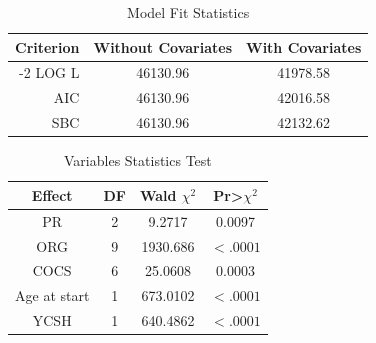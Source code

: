 \begin{table}[htbp]
	\small
	\centering
	\caption{Model Fit Statistics}
	\begin{tabular}{rrr}
		\hline
		\multicolumn{1}{c}{Criterion} & \multicolumn{1}{c}{Without Covariates} & \multicolumn{1}{c}{With Covariates} \\
		\hline
		-2 LOG L & \multicolumn{1}{c}{46130.96} & \multicolumn{1}{c}{41978.58} \\
		AIC   & \multicolumn{1}{c}{46130.96} & \multicolumn{1}{c}{42016.58} \\
		SBC   & \multicolumn{1}{c}{46130.96} & \multicolumn{1}{c}{42132.62} \\
		\hline
	\end{tabular}%
	\label{tab:fit1}
\end{table}%

\begin{table}[htbp]
	\small
	\centering
	\caption{Variables Statistics Test}
	\begin{tabular}{cccc}
		\hline
		Effect & DF    & Wald $\chi^2$ &  Pr>$\chi^2$ \\
		\hline
		PR    & 2     & 9.2717 & 0.0097 \\
		ORG   & 9     & 1930.686 & $<.0001$ \\
		COCS  & 6     & 25.0608 & 0.0003 \\
		Age at start  & 1     & 673.0102 & $<.0001$ \\
		YCSH  & 1     & 640.4862 &$ <.0001$ \\
		\hline
	\end{tabular}%
	\label{tab:variable1}
\end{table}%
